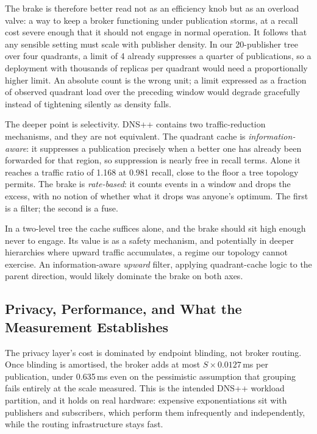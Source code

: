 \documentclass[10pt]{article}
\begin{document}
The brake is therefore better read not as an efficiency knob but as an overload valve: a way to keep a broker functioning under publication storms, at a recall cost severe enough that it should not engage in normal operation. It follows that any sensible setting must scale with publisher density. In our 20-publisher tree over four quadrants, a limit of 4 already suppresses a quarter of publications, so a deployment with thousands of replicas per quadrant would need a proportionally higher limit. An absolute count is the wrong unit; a limit expressed as a fraction of observed quadrant load over the preceding window would degrade gracefully instead of tightening silently as density falls.

The deeper point is selectivity. DNS++ contains two traffic-reduction mechanisms, and they are not equivalent. The quadrant cache is \emph{information-aware}: it suppresses a publication precisely when a better one has already been forwarded for that region, so suppression is nearly free in recall terms. Alone it reaches a traffic ratio of 1.168 at 0.981 recall, close to the floor a tree topology permits. The brake is \emph{rate-based}: it counts events in a window and drops the excess, with no notion of whether what it drops was anyone's optimum. The first is a filter; the second is a fuse.

In a two-level tree the cache suffices alone, and the brake should sit high enough never to engage. Its value is as a safety mechanism, and potentially in deeper hierarchies where upward traffic accumulates, a regime our topology cannot exercise. An information-aware \emph{upward} filter, applying quadrant-cache logic to the parent direction, would likely dominate the brake on both axes.

\subsection{Privacy, Performance, and What the Measurement Establishes}

The privacy layer's cost is dominated by endpoint blinding, not broker routing. Once blinding is amortised, the broker adds at most $S \times 0.0127$\,ms per publication, under 0.635\,ms even on the pessimistic assumption that grouping fails entirely at the scale measured. This is the intended DNS++ workload partition, and it holds on real hardware: expensive exponentiations sit with publishers and subscribers, which perform them infrequently and independently, while the routing infrastructure stays fast.
\end{document}
